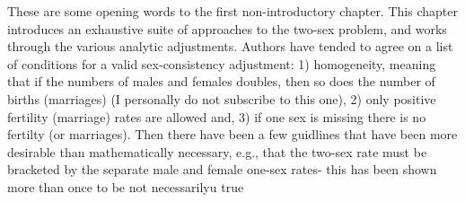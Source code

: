 % 
These are some opening words to the first non-introductory chapter. This chapter introduces an exhaustive suite of
 approaches to the two-sex problem, and works through the various analytic adjustments. Authors have tended to agree on a list of conditions for a valid sex-consistency adjustment: 1) homogeneity, meaning that if the numbers of males and females doubles, then so does the number of births (marriages) (I personally do not subscribe to this one), 2) only positive fertility (marriage) rates are allowed and, 3) if one sex is missing there is no fertilty (or marriages). Then there have been a few guidlines that have been more desirable than mathematically necessary, e.g., that the two-sex rate must be bracketed by the separate male and female one-sex rates- this has been shown more than once to be not necessarilyu true \citep{yellin1977comparison}

